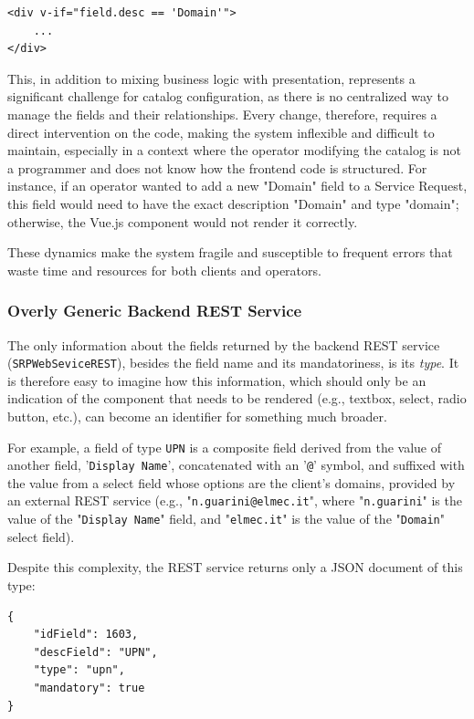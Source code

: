\begin{verbatim}
<div v-if="field.desc == 'Domain'">
    ...
</div>
\end{verbatim}

This, in addition to mixing business logic with presentation, represents a significant challenge for catalog configuration, as there is no centralized way to manage the fields and their relationships. Every change, therefore, requires a direct intervention on the code, making the system inflexible and difficult to maintain, especially in a context where the operator modifying the catalog is not a programmer and does not know how the frontend code is structured. For instance, if an operator wanted to add a new "Domain" field to a Service Request, this field would need to have the exact description "Domain" and type "domain"; otherwise, the Vue.js component would not render it correctly.

These dynamics make the system fragile and susceptible to frequent errors that waste time and resources for both clients and operators.

\subsubsection{Overly Generic Backend REST Service}

The only information about the fields returned by the backend REST service (\texttt{SRPWebSeviceREST}), besides the field name and its mandatoriness, is its \textit{type}. It is therefore easy to imagine how this information, which should only be an indication of the component that needs to be rendered (e.g., textbox, select, radio button, etc.), can become an identifier for something much broader.

For example, a field of type \texttt{UPN} is a composite field derived from the value of another field, '\texttt{Display Name}', concatenated with an '\texttt{@}' symbol, and suffixed with the value from a select field whose options are the client's domains, provided by an external REST service (e.g., "\texttt{n.guarini@elmec.it}", where "\texttt{n.guarini}" is the value of the "\texttt{Display Name}" field, and "\texttt{elmec.it}" is the value of the "\texttt{Domain}" select field). 

Despite this complexity, the REST service returns only a JSON document of this type:

\begin{verbatim}
{
    "idField": 1603,
    "descField": "UPN",
    "type": "upn",
    "mandatory": true
}
\end{verbatim}

